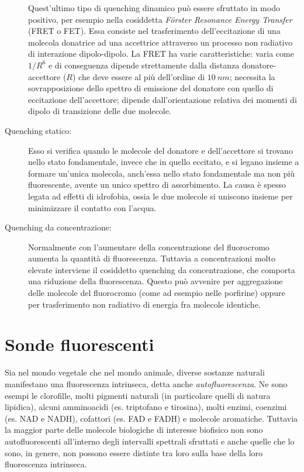 \begin{description}
Quest'ultimo tipo di quenching dinamico può essere sfruttato in modo positivo, per esempio nella cosiddetta \textit{F\"{o}rster Resonance Energy Transfer} (FRET o FET). 
Essa consiste nel trasferimento dell'eccitazione di una molecola donatrice ad una accettrice attraverso un processo non radiativo di interazione dipolo-dipolo.
La FRET ha varie caratteristiche: varia come $1/R^6$ e di conseguenza dipende strettamente dalla distanza donatore-accettore ($R$) che deve essere al più dell'ordine di $10\ nm$; necessita la sovrapposizione dello spettro di emissione del donatore con quello di eccitazione dell'accettore; dipende dall'orientazione relativa dei momenti di dipolo di transizione delle due molecole.
\item [Quenching statico:]
Esso si verifica quando le molecole del donatore e dell'accettore si trovano nello stato fondamentale, invece che in quello eccitato, e si legano insieme a formare un'unica molecola, anch'essa nello stato fondamentale ma non più fluorescente, avente un unico spettro di assorbimento. 
La causa è spesso legata ad effetti di idrofobia, ossia le due molecole si uniscono insieme per minimizzare il contatto con l'acqua.
\item [Quenching da concentrazione:]
Normalmente con l'aumentare della concentrazione del fluorocromo aumenta la quantità di fluorescenza. 
Tuttavia a concentrazioni molto elevate interviene il cosiddetto quenching da concentrazione, che comporta una riduzione della fluorescenza.
Questo può avvenire per aggregazione delle molecole del fluorocromo (come ad esempio nelle porfirine) oppure per trasferimento non radiativo di energia fra molecole identiche.
\end{description} 


\section{Sonde fluorescenti}

Sia nel mondo vegetale che nel mondo animale, diverse sostanze naturali manifestano una fluorescenza intrinseca, detta anche \textit{autofluorescenza}.
Ne sono esempi le clorofille, molti pigmenti naturali (in particolare quelli di natura lipidica), alcuni amminoacidi (es. triptofano e tirosina), molti enzimi, coenzimi (es. NAD e NADH), cofattori (es. FAD e FADH) e molecole aromatiche. 
Tuttavia la maggior parte delle molecole biologiche di interesse biofisico non sono autofluorescenti all'interno degli intervalli spettrali sfruttati e anche quelle che lo sono, in genere, non possono essere distinte tra loro sulla base della loro fluorescenza intrinseca.

